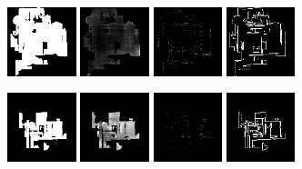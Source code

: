 \begin{figure}[h!]
\begin{minipage}[b]{\linewidth}
	\begin{center}
		\includegraphics[width=2cm]{figures/results/samples/uncond/sample21_map_floormap_generated.png}
		\includegraphics[width=2cm]{figures/results/samples/uncond/sample21_map_heightmap_generated.png}
		\includegraphics[width=2cm]{figures/results/samples/uncond/sample21_map_thingsmap_generated.png}
		\includegraphics[width=2cm]{figures/results/samples/uncond/sample21_map_wallmap_generated.png}
	\end{center}

	\begin{center}
		\includegraphics[width=2cm]{figures/results/samples/uncond/sample27_map_floormap_generated.png}
		\includegraphics[width=2cm]{figures/results/samples/uncond/sample27_map_heightmap_generated.png}
		\includegraphics[width=2cm]{figures/results/samples/uncond/sample27_map_thingsmap_generated.png}
		\includegraphics[width=2cm]{figures/results/samples/uncond/sample27_map_wallmap_generated.png}
	\end{center}
	

\end{minipage}
\end{figure}

